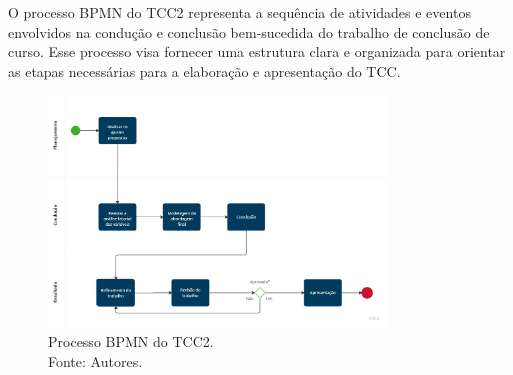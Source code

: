 O processo BPMN do TCC2 representa a sequência de atividades e eventos envolvidos na condução e conclusão bem-sucedida do trabalho de conclusão de curso. Esse processo visa fornecer uma estrutura clara e organizada para orientar as etapas necessárias para a elaboração e apresentação do TCC.

\begin{figure}[H]
    \centering
    \includegraphics[width=0.8\textwidth]{figuras/bpmn2.jpg}
    \caption{Processo BPMN do TCC2. \\
    Fonte: Autores.}
    \label{fig:bpmn2}
\end{figure}

